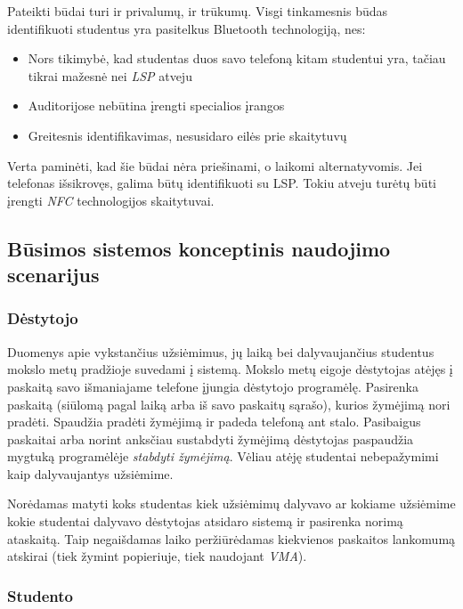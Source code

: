 \documentclass{VUMIFPSkursinis}
\begin{document}
Pateikti būdai turi ir privalumų, ir trūkumų. Visgi tinkamesnis būdas identifikuoti studentus yra pasitelkus Bluetooth technologiją, nes:

\begin{itemize}
    \item Nors tikimybė, kad studentas duos savo telefoną kitam studentui yra, tačiau tikrai mažesnė nei \textit{LSP} atveju
	\item Auditorijose nebūtina įrengti specialios įrangos
	\item Greitesnis identifikavimas, nesusidaro eilės prie skaitytuvų
\end{itemize}

Verta paminėti, kad šie būdai nėra priešinami, o laikomi alternatyvomis. Jei telefonas išsikrovęs, galima būtų identifikuoti su LSP. Tokiu atveju turėtų būti įrengti \textit{NFC} technologijos skaitytuvai.

\subsection{Būsimos sistemos konceptinis naudojimo scenarijus}

\subsubsection{Dėstytojo}

Duomenys apie vykstančius užsiėmimus, jų laiką bei dalyvaujančius studentus mokslo metų pradžioje suvedami į sistemą. Mokslo metų eigoje dėstytojas atėjęs į paskaitą savo išmaniajame telefone įjungia dėstytojo programėlę. Pasirenka paskaitą (siūlomą pagal laiką arba iš savo paskaitų sąrašo), kurios žymėjimą nori pradėti. Spaudžia pradėti žymėjimą ir padeda telefoną ant stalo. Pasibaigus paskaitai arba norint anksčiau sustabdyti žymėjimą dėstytojas paspaudžia mygtuką programėlėje \textit{stabdyti žymėjimą}. Vėliau atėję studentai nebepažymimi kaip dalyvaujantys užsiėmime.

Norėdamas matyti koks studentas kiek užsiėmimų dalyvavo ar kokiame užsiėmime kokie studentai dalyvavo dėstytojas atsidaro sistemą ir pasirenka norimą ataskaitą. Taip negaišdamas laiko peržiūrėdamas kiekvienos paskaitos lankomumą atskirai (tiek žymint popieriuje, tiek naudojant \textit{VMA}). 

\subsubsection{Studento}
\end{document}

